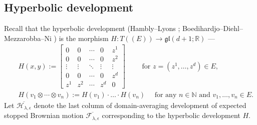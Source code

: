 \documentclass[11pt,a4paper,english,reqno]{amsart}
\theoremstyle{plain}
\newcommand{\R}{\mathbb{R}}
\newcommand{\e}{\epsilon}
\newcommand{\1}{\mathbbm{1}}
\begin{document}
\subsection{Hyperbolic development} Recall that the hyperbolic development (Hambly--Lyons \cite{hl}; Boedihardjo--Diehl--Mezzarobba--Ni \cite{boedihardjo2021expected}) is the morphism $H: T((E)) \to \mathfrak{gl}(d+1;\R)$ ---
\begin{eqnarray*}
&&H (x,y) := \begin{bmatrix}
0&0&\cdots &0 & z^1\\
0&0&\cdots &0 & z^2\\
\vdots & \vdots &\ddots &\vdots& \vdots \\
0&0&\cdots &0 & z^d\\
z^1&z^2&\cdots &z^{d}&0
\end{bmatrix}\qquad \text{ for } z = (z^1,\ldots,z^d) \in E,\\
&&H(v_1 \otimes\cdots\otimes v_n) := H(v_1) \cdot \ldots \cdot H(v_n)\quad \text{ for any $n\in\mathbb{N}$ and $v_1,\ldots,v_n \in E$}.
\end{eqnarray*}
Let $\overline{\mathcal{H}_{\lambda,\e}}$ denote the last column of domain-averaging development of expected stopped Brownian motion $\overline{\mathcal{F}_{\lambda, \e}}$ corresponding to the hyperbolic development $H$.
\end{document}
